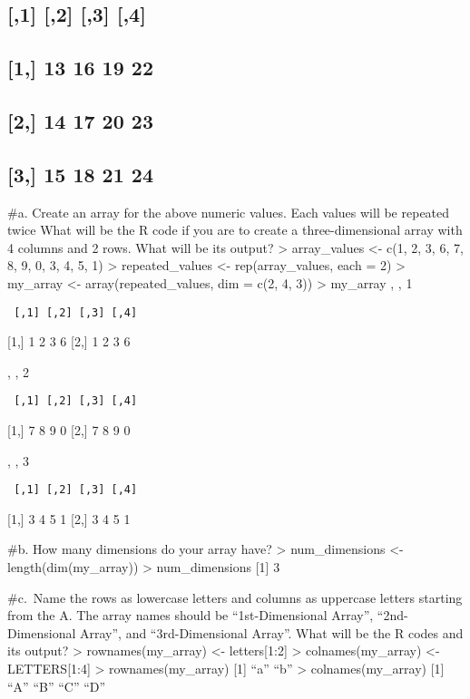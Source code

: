 \documentclass[
]{article}
\begin{document}
\hypertarget{section-24}{%
\subsection{{[},1{]} {[},2{]} {[},3{]} {[},4{]}}\label{section-24}}

\hypertarget{section-25}{%
\subsection{{[}1,{]} 13 16 19 22}\label{section-25}}

\hypertarget{section-26}{%
\subsection{{[}2,{]} 14 17 20 23}\label{section-26}}

\hypertarget{section-27}{%
\subsection{{[}3,{]} 15 18 21 24}\label{section-27}}

\#a. Create an array for the above numeric values. Each values will be
repeated twice What will be the R code if you are to create a
three-dimensional array with 4 columns and 2 rows. What will be its
output? \textgreater{} array\_values \textless- c(1, 2, 3, 6, 7, 8, 9,
0, 3, 4, 5, 1) \textgreater{} repeated\_values \textless-
rep(array\_values, each = 2) \textgreater{} my\_array \textless-
array(repeated\_values, dim = c(2, 4, 3)) \textgreater{} my\_array , , 1

\begin{verbatim}
 [,1] [,2] [,3] [,4]
\end{verbatim}

{[}1,{]} 1 2 3 6 {[}2,{]} 1 2 3 6

, , 2

\begin{verbatim}
 [,1] [,2] [,3] [,4]
\end{verbatim}

{[}1,{]} 7 8 9 0 {[}2,{]} 7 8 9 0

, , 3

\begin{verbatim}
 [,1] [,2] [,3] [,4]
\end{verbatim}

{[}1,{]} 3 4 5 1 {[}2,{]} 3 4 5 1

\#b. How many dimensions do your array have? \textgreater{}
num\_dimensions \textless- length(dim(my\_array)) \textgreater{}
num\_dimensions {[}1{]} 3

\#c.~Name the rows as lowercase letters and columns as uppercase letters
starting from the A. The array names should be ``1st-Dimensional
Array'', ``2nd-Dimensional Array'', and ``3rd-Dimensional Array''. What
will be the R codes and its output? \textgreater{} rownames(my\_array)
\textless- letters{[}1:2{]} \textgreater{} colnames(my\_array)
\textless- LETTERS{[}1:4{]} \textgreater{} rownames(my\_array) {[}1{]}
``a'' ``b'' \textgreater{} colnames(my\_array) {[}1{]} ``A'' ``B'' ``C''
``D''
\end{document}

